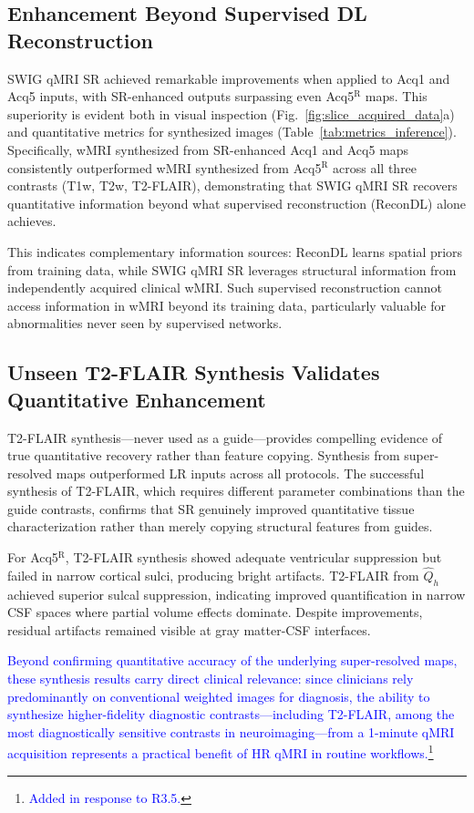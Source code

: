 \documentclass[journal,twoside,web]{ieeecolor}
\newcommand{\added}[1]{\textcolor{blue}{#1}}      %
\begin{document}
\subsection{Enhancement Beyond Supervised DL Reconstruction}
SWIG qMRI SR achieved remarkable improvements when applied to Acq1 and Acq5 inputs, with SR-enhanced outputs surpassing even Acq5$^{\text{R}}$ maps. This superiority is evident both in visual inspection (Fig.~\ref{fig:slice_acquired_data}a) and quantitative metrics for synthesized images (Table~\ref{tab:metrics_inference}). Specifically, wMRI synthesized from SR-enhanced Acq1 and Acq5 maps consistently outperformed wMRI synthesized from Acq5$^{\text{R}}$ across all three contrasts (T1w, T2w, T2-FLAIR), demonstrating that SWIG qMRI SR recovers quantitative information beyond what supervised reconstruction (ReconDL) alone achieves.

This indicates complementary information sources: ReconDL learns spatial priors from training data, while SWIG qMRI SR leverages structural information from independently acquired clinical wMRI. Such supervised reconstruction cannot access information in wMRI beyond its training data, particularly valuable for abnormalities never seen by supervised networks.


\subsection{Unseen T2-FLAIR Synthesis Validates Quantitative Enhancement}
T2-FLAIR synthesis—never used as a guide—provides compelling evidence of true quantitative recovery rather than feature copying. Synthesis from super-resolved maps outperformed LR inputs across all protocols. The successful synthesis of T2-FLAIR, which requires different parameter combinations than the guide contrasts, confirms that SR genuinely improved quantitative tissue characterization rather than merely copying structural features from guides.

For Acq5$^{\text{R}}$, T2-FLAIR  synthesis showed adequate ventricular suppression but failed in narrow cortical sulci, producing bright artifacts. T2-FLAIR from $\hat{Q}_h$ achieved superior sulcal suppression, indicating improved quantification in narrow CSF spaces where partial volume effects dominate.  Despite improvements, residual artifacts remained visible at gray matter-CSF interfaces.

\added{Beyond confirming quantitative accuracy of the underlying super-resolved maps, these synthesis results carry direct clinical relevance: since clinicians rely predominantly on conventional weighted images for diagnosis, the ability to synthesize higher-fidelity diagnostic contrasts---including T2-FLAIR, among the most diagnostically sensitive contrasts in neuroimaging---from a 1-minute qMRI acquisition represents a practical benefit of HR qMRI in routine workflows.\footnote{\textcolor{blue}{Added in response to R3.5.}}}
\end{document}
